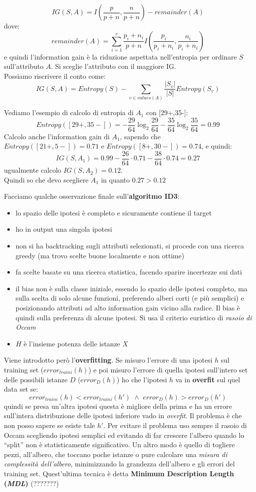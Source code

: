 \documentclass[a4paper,12pt, oneside]{book}
\begin{document}
\[IG(S,A)=I\left(\frac{p}{p+n},\frac{n}{p+n}\right)-remainder(A)\]
dove:
\[remainder(A)=\sum_{i=1}^v \frac{p_i+n_i}{p+n}
  I\left(\frac{p_i}{p_i+n_i},\frac{n_i}{p_i+n_i}\right)\]
e quindi l'information gain è la riduzione aspettata nell'entropia per ordinare
$S$ sull'attributo $A$. Si sceglie l'attributo con il maggiore IG.\\
Possiamo riscrivere il conto come:
\[IG(S,A)=Entropy(S)-\sum_{v\in values(A)}\frac{|S_v|}{|S|}Entropy(S_v)\]
\begin{esempio}
  Vediamo l'esempio di calcolo di entropia di $A_1$ con [29+,35-]:
  \[Entropy([29+,35-])=
    -\frac{29}{64}\log_2\frac{29}{64}-\frac{35}{64}\log_2\frac{35}{64}=0.99\]
  Calcolo anche l'information gain di $A_1$, sapendo che
  $Entropy([21+,5-])=0.71$ e $Entropy([8+,30-])=0.74$,
  e quindi:
  \[IG(S,A_1)=0.99-\frac{26}{64}\cdot 0.71-\frac{38}{64}\cdot 0.74=0.27\]
  ugualmente calcolo $IG(S,A_2)=0.12$. \\
  Quindi so che devo scegliere $A_1$ in quanto $0.27 > 0.12$
\end{esempio}
Facciamo qualche osservazione finale sull'\textbf{algoritmo ID3}:
\begin{itemize}
  \item lo spazio delle ipotesi è completo e sicuramente contiene il target
  \item ho in output una singola ipotesi
  \item non si ha backtracking sugli attributi selezionati, si procede con una
  ricerca greedy (ma trovo scelte buone localmente e non ottime)
  \item fa scelte basate su una ricerca statistica, facendo sparire incertezze
  sui dati
  \item il bias non è sulla classe iniziale, essendo lo spazio delle ipotesi
  completo, ma sulla scelta di solo alcune funzioni, preferendo alberi corti (e
  più semplici) e posizionando attributi ad alto information gain vicino alla
  radice. Il bias è quindi sulla preferenza di alcune ipotesi. Si usa il
  criterio euristico di \textit{rasoio di Occam}
  \item $H$ è l'insieme potenza delle istanze $X$
\end{itemize}
Viene introdotto però l'\textbf{overfitting}. Se misuro l'errore di una ipotesi
$h$ sul training set ($error_{traini}(h)$) e poi misuro l'errore di quella
ipotesi sull'intero set delle possibili istanze
$D$ ($error_D(h)$) ho che l'ipotesi $h$ va in \textbf{overfit} sul quel data set
se:
\[error_{traini}(h) < error_{traini}(h') \,\,\land
  \,\,error_D(h)>error_D(h')\]
quindi se presa un'altra ipotesi questa è migliore della prima e ha un errore
sull'intera distribuzione delle ipotesi inferiore vado in \textit{overfit}. Il
problema è che non posso sapere se esiste tale $h'$. Per evitare il problema uso
sempre il rasoio di Occam scegliendo ipotesi semplici ed evitando di far
crescere l'albero quando lo ``split'' non è statisticamente significativo. Un
altro modo è quello di togliere pezzi, all'albero, che toccano poche istanze o
pure calcolare una \textit{misura di complessità dell'albero}, minimizzando la
grandezza dell'albero e gli errori del training set. Quest'ultima tecnica è
detta \textbf{Minimum Description Length (\textit{MDL})} (???????)
\end{document}
